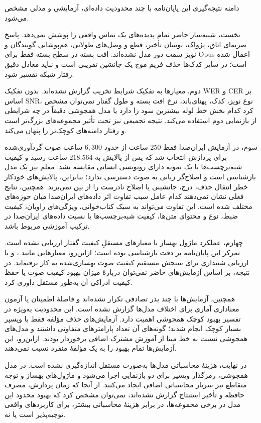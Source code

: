 
دامنه نتیجه‌گیری این پایان‌نامه با چند محدودیت داده‌ای، آزمایشی و مدلی مشخص می‌شود.

نخست، شبیه‌ساز حاضر تمام پدیده‌های یک تماس واقعی را پوشش نمی‌دهد. پاسخ ضربه‌ای اتاق، پژواک، نوسان تأخیر، قطع و وصل‌های طولانی، هم‌پوشانی گویندگان و نویز سمت دور مدل نشده‌اند. افت بسته در سطح بسته فقط برای Opus اعمال شده است؛ در سایر کدک‌ها حذف فریم موج یک جانشین تقریبی است و نباید معادل دقیق رفتار شبکه تفسیر شود.

دوم، معیارها به تفکیک شرایط تخریب گزارش نشده‌اند. بدون تفکیک WER و CER بر اساس SNR، نوع نویز، کدک، پهنای‌باند، نرخ افت بسته و طول گفتار نمی‌توان مشخص کرد کدام بخش خط لوله بیشترین سود را دارد یا مدل همجوشی دقیقاً در چه شرایطی از بازنمایی دوم استفاده می‌کند. نتیجه تجمیعی نیز تحت تأثیر مجموعه‌های بزرگ‌تر است و رفتار دامنه‌های کوچک‌تر را پنهان می‌کند.

سوم، در آزمایش ایران‌صدا فقط $250$ ساعت از حدود $6{,}300$ ساعت صوت گردآوری‌شده برای پردازش انتخاب شد که پس از پالایش به $218.564$ ساعت رسید و کیفیت شبه‌برچسب‌ها با یک نمونه دارای رونویسی انسانی مقایسه نشد. معلم نیز یک مدل بازشناسی است و اصلاح‌گر زبانی به صوت دسترسی ندارد؛ بنابراین، پالایش‌های خودکار خطر انتقال حذف، درج، جانشینی یا اصلاح نادرست را از بین نمی‌برند. همچنین، نتایج فعلی نشان نمی‌دهند کدام عامل سبب تفاوت اثر داده‌های ایران‌صدا میان حوزه‌های مختلف شده است. این تفاوت می‌تواند به سبک کتاب‌خوانی، ویژگی‌های راویان، کیفیت ضبط، نوع و محتوای متن‌ها، کیفیت شبه‌برچسب‌ها یا نسبت داده‌های ایران‌صدا در ترکیب آموزشی مربوط باشد.

چهارم، عملکرد ماژول بهساز با معیارهای مستقلِ کیفیت گفتار ارزیابی نشده است. تمرکز این پایان‌نامه بر دقت بازشناسی بوده است؛ ازاین‌رو، معیارهایی مانند ،  و  یا ارزیابی شنیداری برای سنجش مستقیم کیفیت صوت بهسازی‌شده به کار نرفته‌اند. در نتیجه، بر اساس آزمایش‌های حاضر نمی‌توان دربارهٔ میزان بهبود کیفیت صوت یا حفظ کیفیت ادراکی آن به‌طور مستقل داوری کرد.

همچنین، آزمایش‌ها با چند بذر تصادفی تکرار نشده‌اند و فاصلهٔ اطمینان یا آزمون معناداری آماری برای اختلاف مدل‌ها گزارش نشده است. این محدودیت به‌ویژه در تفسیر بهبود کوچک همجوشی اهمیت دارد. آزمایش‌های حذف مؤلفه فقط با ویسپر بسیار کوچک انجام شدند؛ گونه‌های آن تعداد پارامترهای متفاوتی داشتند و مدل‌های همجوشی نسبت به خط مبنا از آموزش مشترک اضافی برخوردار بودند. ازاین‌رو، این آزمایش‌ها تمام بهبود را به یک مؤلفهٔ منفرد نسبت نمی‌دهند.

در نهایت، هزینهٔ محاسباتی مدل‌ها به‌صورت مستقل اندازه‌گیری نشده است. در مدل همجوشی، رمزگذار ویسپر برای دو بازنمایی اجرا می‌شود و ماژول‌های بهساز و توجه متقاطع نیز سربار محاسباتی اضافی ایجاد می‌کنند. از آنجا که زمان پردازش، مصرف حافظه و تأخیر استنتاج گزارش نشده‌اند، نمی‌توان مشخص کرد که بهبود محدود این مدل در برخی مجموعه‌ها، در برابر هزینهٔ محاسباتی بیشتر، برای کاربردهای واقعی توجیه‌پذیر است یا نه.

